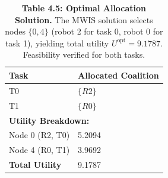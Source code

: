 \begin{table}[H]
\centering
\caption{\textbf{Table 4.5: Optimal Allocation Solution.} The MWIS solution selects nodes $\{0, 4\}$ (robot 2 for task 0, robot 0 for task 1), yielding total utility $U^{\text{opt}} = 9.1787$. Feasibility verified for both tasks.}
\label{tab:4-5}
\small
\begin{tabular}{ll}
\toprule
\textbf{Task} & \textbf{Allocated Coalition} \\
\midrule
\rowcolor{gray!15}
T0 & $\{R2\}$ \\
T1 & $\{R0\}$ \\
\midrule
\multicolumn{2}{l}{\textbf{Utility Breakdown:}} \\
\rowcolor{gray!15}
Node 0 (R2, T0) & 5.2094 \\
Node 4 (R0, T1) & 3.9692 \\
\midrule
\textbf{Total Utility} & 9.1787 \\
\bottomrule
\end{tabular}
\end{table}
